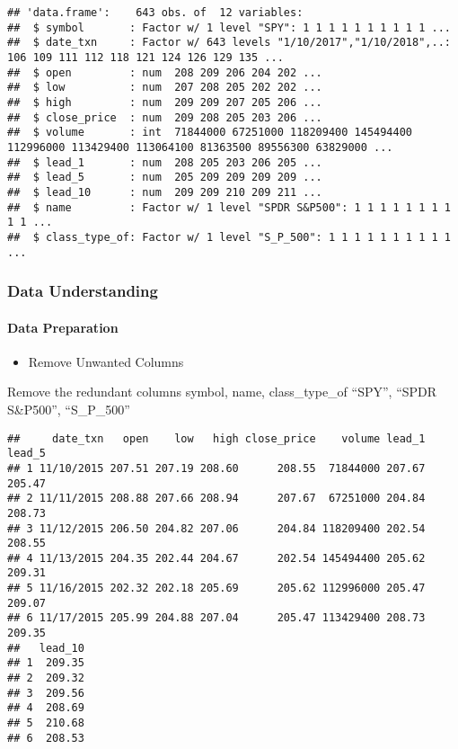 \documentclass[]{article}
\providecommand{\tightlist}{%
  \setlength{\itemsep}{0pt}\setlength{\parskip}{0pt}}
\let\oldparagraph\paragraph
\renewcommand{\paragraph}[1]{\oldparagraph{#1}\mbox{}}
\begin{document}
\begin{verbatim}
## 'data.frame':    643 obs. of  12 variables:
##  $ symbol       : Factor w/ 1 level "SPY": 1 1 1 1 1 1 1 1 1 1 ...
##  $ date_txn     : Factor w/ 643 levels "1/10/2017","1/10/2018",..: 106 109 111 112 118 121 124 126 129 135 ...
##  $ open         : num  208 209 206 204 202 ...
##  $ low          : num  207 208 205 202 202 ...
##  $ high         : num  209 209 207 205 206 ...
##  $ close_price  : num  209 208 205 203 206 ...
##  $ volume       : int  71844000 67251000 118209400 145494400 112996000 113429400 113064100 81363500 89556300 63829000 ...
##  $ lead_1       : num  208 205 203 206 205 ...
##  $ lead_5       : num  205 209 209 209 209 ...
##  $ lead_10      : num  209 209 210 209 211 ...
##  $ name         : Factor w/ 1 level "SPDR S&P500": 1 1 1 1 1 1 1 1 1 1 ...
##  $ class_type_of: Factor w/ 1 level "S_P_500": 1 1 1 1 1 1 1 1 1 1 ...
\end{verbatim}

\subsubsection{Data Understanding}\label{data-understanding}

\paragraph{Data Preparation}\label{data-preparation}

\begin{itemize}
\tightlist
\item
  Remove Unwanted Columns
\end{itemize}

Remove the redundant columns symbol, name, class\_type\_of ``SPY'',
``SPDR S\&P500'', ``S\_P\_500''

\begin{verbatim}
##     date_txn   open    low   high close_price    volume lead_1 lead_5
## 1 11/10/2015 207.51 207.19 208.60      208.55  71844000 207.67 205.47
## 2 11/11/2015 208.88 207.66 208.94      207.67  67251000 204.84 208.73
## 3 11/12/2015 206.50 204.82 207.06      204.84 118209400 202.54 208.55
## 4 11/13/2015 204.35 202.44 204.67      202.54 145494400 205.62 209.31
## 5 11/16/2015 202.32 202.18 205.69      205.62 112996000 205.47 209.07
## 6 11/17/2015 205.99 204.88 207.04      205.47 113429400 208.73 209.35
##   lead_10
## 1  209.35
## 2  209.32
## 3  209.56
## 4  208.69
## 5  210.68
## 6  208.53
\end{verbatim}
\end{document}
